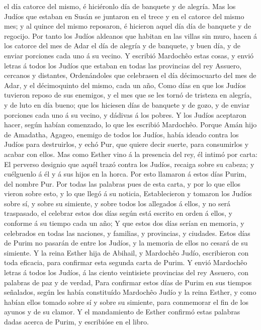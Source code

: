 el día catorce del mismo, é hiciéronlo día de banquete y de alegría.
 Mas los Judíos que estaban en Susán se juntaron en el
trece y en el catorce del mismo mes; y al quince del mismo reposaron, é
hicieron aquel día día de banquete y de regocijo.  Por
tanto los Judíos aldeanos que habitan en las villas sin muro, hacen á
los catorce del mes de Adar el día de alegría y de banquete, y buen día,
y de enviar porciones cada uno á su vecino.  Y escribió
Mardochêo estas cosas, y envió letras á todos los Judíos que estaban en
todas las provincias del rey Assuero, cercanos y distantes,
 Ordenándoles que celebrasen el día décimocuarto del mes
de Adar, y el décimoquinto del mismo, cada un año,  Como
días en que los Judíos tuvieron reposo de sus enemigos, y el mes que se
les tornó de tristeza en alegría, y de luto en día bueno; que los
hiciesen días de banquete y de gozo, y de enviar porciones cada uno á su
vecino, y dádivas á los pobres.  Y los Judíos aceptaron
hacer, según habían comenzado, lo que les escribió Mardochêo.
 Porque Amán hijo de Amadatha, Agageo, enemigo de todos
los Judíos, había ideado contra los Judíos para destruirlos, y echó Pur,
que quiere decir suerte, para consumirlos y acabar con ellos.
 Mas como Esther vino á la presencia del rey, él intimó
por carta: El perverso designio que aquél trazó contra los Judíos,
recaiga sobre su cabeza; y cuélguenlo á él y á sus hijos en la horca.
 Por esto llamaron á estos días Purim, del nombre Pur.
Por todas las palabras pues de esta carta, y por lo que ellos vieron
sobre esto, y lo que llegó á su noticia,  Establecieron y
tomaron los Judíos sobre sí, y sobre su simiente, y sobre todos los
allegados á ellos, y no será traspasado, el celebrar estos dos días
según está escrito en orden á ellos, y conforme á su tiempo cada un año;
 Y que estos dos días serían en memoria, y celebrados en
todas las naciones, y familias, y provincias, y ciudades. Estos días de
Purim no pasarán de entre los Judíos, y la memoria de ellos no cesará de
su simiente.  Y la reina Esther hija de Abihail, y
Mardochêo Judío, escribieron con toda eficacia, para confirmar esta
segunda carta de Purim.  Y envió Mardochêo letras á todos
los Judíos, á las ciento veintisiete provincias del rey Assuero, con
palabras de paz y de verdad,  Para confirmar estos días
de Purim en sus tiempos señalados, según les había constituído Mardochêo
Judío y la reina Esther, y como habían ellos tomado sobre sí y sobre su
simiente, para conmemorar el fin de los ayunos y de su clamor.
 Y el mandamiento de Esther confirmó estas palabras dadas
acerca de Purim, y escribióse en el libro.

